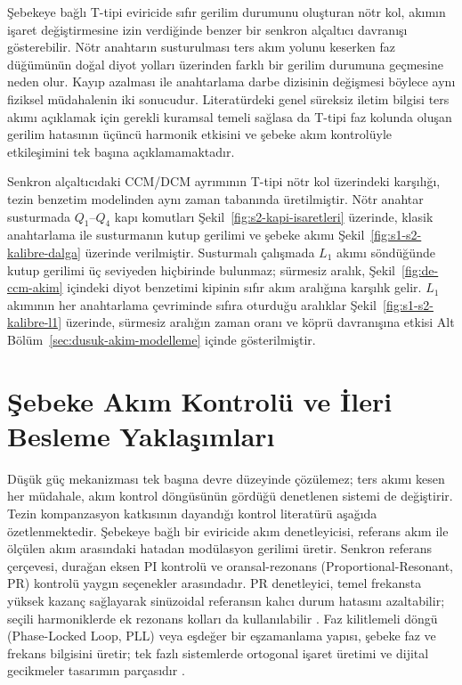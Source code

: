 Şebekeye bağlı T-tipi eviricide sıfır gerilim durumunu oluşturan nötr kol, akımın işaret değiştirmesine izin verdiğinde benzer bir senkron alçaltıcı davranışı gösterebilir. Nötr anahtarın susturulması ters akım yolunu keserken faz düğümünün doğal diyot yolları üzerinden farklı bir gerilim durumuna geçmesine neden olur. Kayıp azalması ile anahtarlama darbe dizisinin değişmesi böylece aynı fiziksel müdahalenin iki sonucudur. Literatürdeki genel süreksiz iletim bilgisi ters akımı açıklamak için gerekli kuramsal temeli sağlasa da T-tipi faz kolunda oluşan gerilim hatasının üçüncü harmonik etkisini ve şebeke akım kontrolüyle etkileşimini tek başına açıklamamaktadır.

Senkron alçaltıcıdaki CCM/DCM ayrımının T-tipi nötr kol üzerindeki karşılığı, tezin benzetim modelinden aynı zaman tabanında üretilmiştir. Nötr anahtar susturmada $Q_1$--$Q_4$ kapı komutları Şekil~\ref{fig:s2-kapi-isaretleri} üzerinde, klasik anahtarlama ile susturmanın kutup gerilimi ve şebeke akımı Şekil~\ref{fig:s1-s2-kalibre-dalga} üzerinde verilmiştir. Susturmalı çalışmada $L_1$ akımı söndüğünde kutup gerilimi üç seviyeden hiçbirinde bulunmaz; sürmesiz aralık, Şekil~\ref{fig:de-ccm-akim} içindeki diyot benzetimi kipinin sıfır akım aralığına karşılık gelir. $L_1$ akımının her anahtarlama çevriminde sıfıra oturduğu aralıklar Şekil~\ref{fig:s1-s2-kalibre-l1} üzerinde, sürmesiz aralığın zaman oranı ve köprü davranışına etkisi Alt Bölüm~\ref{sec:dusuk-akim-modelleme} içinde gösterilmiştir.

\section{Şebeke Akım Kontrolü ve İleri Besleme Yaklaşımları}

Düşük güç mekanizması tek başına devre düzeyinde çözülemez; ters akımı kesen her müdahale, akım kontrol döngüsünün gördüğü denetlenen sistemi de değiştirir. Tezin kompanzasyon katkısının dayandığı kontrol literatürü aşağıda özetlenmektedir. Şebekeye bağlı bir eviricide akım denetleyicisi, referans akım ile ölçülen akım arasındaki hatadan modülasyon gerilimi üretir. Senkron referans çerçevesi, durağan eksen PI kontrolü ve oransal-rezonans (Proportional-Resonant, PR) kontrolü yaygın seçenekler arasındadır. PR denetleyici, temel frekansta yüksek kazanç sağlayarak sinüzoidal referansın kalıcı durum hatasını azaltabilir; seçili harmoniklerde ek rezonans kolları da kullanılabilir \citep{Teodorescu2006PR,Teodorescu2011}. Faz kilitlemeli döngü (Phase-Locked Loop, PLL) veya eşdeğer bir eşzamanlama yapısı, şebeke faz ve frekans bilgisini üretir; tek fazlı sistemlerde ortogonal işaret üretimi ve dijital gecikmeler tasarımın parçasıdır \citep{Blaabjerg2006,Zhou2018}.

